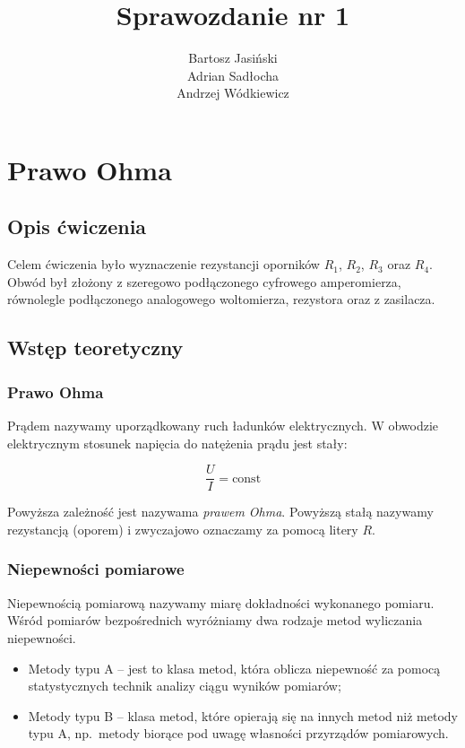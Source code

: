\documentclass[a4paper]{article}
\title{Sprawozdanie nr 1}
\author{
Bartosz Jasiński \\
Adrian Sadłocha \\
Andrzej Wódkiewicz
}
\begin{document}
\maketitle
\setcounter{secnumdepth}{2}
\setcounter{tocdepth}{2}

\section{Prawo Ohma}

\subsection{Opis ćwiczenia}

Celem ćwiczenia było wyznaczenie rezystancji oporników $R_1$, $R_2$, $R_3$ oraz $R_4$.
Obwód był złożony z szeregowo podłączonego cyfrowego amperomierza, równolegle podłączonego analogowego woltomierza, rezystora oraz z zasilacza.

\subsection{Wstęp teoretyczny}

\subsubsection{Prawo Ohma}

Prądem nazywamy uporządkowany ruch ładunków elektrycznych.
W obwodzie elektrycznym stosunek napięcia do natężenia prądu jest stały:

$$\frac{U}{I} = \text{const}$$

Powyższa zależność jest nazywama \textit{prawem Ohma}. Powyższą stałą nazywamy rezystancją (oporem) i zwyczajowo oznaczamy za pomocą litery $R$.

\subsubsection{Niepewności pomiarowe}

Niepewnością pomiarową nazywamy miarę dokładności wykonanego pomiaru.
Wśród pomiarów bezpośrednich wyróżniamy dwa rodzaje metod wyliczania niepewności.

\begin{itemize}
\item Metody typu A -- jest to klasa metod, która oblicza niepewność za pomocą statystycznych technik analizy ciągu wyników pomiarów;
\item Metody typu B -- klasa metod, które opierają się na innych metod niż metody typu A, np.~metody biorące pod uwagę własności przyrządów pomiarowych.
\end{itemize}
\end{document}
